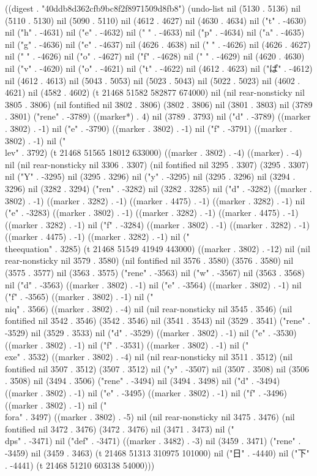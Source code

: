 
((digest . "40ddb8d362cfb9bc8f2f8971509d8fb8") (undo-list nil (5130 . 5136) nil (5110 . 5130) nil (5090 . 5110) nil (4612 . 4627) nil (4630 . 4634) nil ("t" . -4630) nil ("h" . -4631) nil ("e" . -4632) nil (" " . -4633) nil ("p" . -4634) nil ("a" . -4635) nil ("g" . -4636) nil ("e" . -4637) nil (4626 . 4638) nil (" " . -4626) nil (4626 . 4627) nil (" " . -4626) nil ("o" . -4627) nil ("f" . -4628) nil (" " . -4629) nil (4620 . 4630) nil ("v" . -4620) nil ("o" . -4621) nil ("t" . -4622) nil (4612 . 4623) nil ("ぱ" . -4612) nil (4612 . 4613) nil (5043 . 5053) nil (5023 . 5043) nil (5022 . 5023) nil (4602 . 4621) nil (4582 . 4602) (t 21468 51582 582877 674000) nil (nil rear-nonsticky nil 3805 . 3806) (nil fontified nil 3802 . 3806) (3802 . 3806) nil (3801 . 3803) nil (3789 . 3801) ("rene" . -3789) ((marker*) . 4) nil (3789 . 3793) nil ("d" . -3789) ((marker . 3802) . -1) nil ("e" . -3790) ((marker . 3802) . -1) nil ("f" . -3791) ((marker . 3802) . -1) nil ("\\lev" . 3792) (t 21468 51565 18012 633000) ((marker . 3802) . -4) ((marker) . -4) nil (nil rear-nonsticky nil 3306 . 3307) (nil fontified nil 3295 . 3307) (3295 . 3307) nil ("Y" . -3295) nil (3295 . 3296) nil ("y" . -3295) nil (3295 . 3296) nil (3294 . 3296) nil (3282 . 3294) ("ren" . -3282) nil (3282 . 3285) nil ("d" . -3282) ((marker . 3802) . -1) ((marker . 3282) . -1) ((marker . 4475) . -1) ((marker . 3282) . -1) nil ("e" . -3283) ((marker . 3802) . -1) ((marker . 3282) . -1) ((marker . 4475) . -1) ((marker . 3282) . -1) nil ("f" . -3284) ((marker . 3802) . -1) ((marker . 3282) . -1) ((marker . 4475) . -1) ((marker . 3282) . -1) nil ("\\theequation" . 3285) (t 21468 51549 41949 443000) ((marker . 3802) . -12) nil (nil rear-nonsticky nil 3579 . 3580) (nil fontified nil 3576 . 3580) (3576 . 3580) nil (3575 . 3577) nil (3563 . 3575) ("rene" . -3563) nil ("w" . -3567) nil (3563 . 3568) nil ("d" . -3563) ((marker . 3802) . -1) nil ("e" . -3564) ((marker . 3802) . -1) nil ("f" . -3565) ((marker . 3802) . -1) nil ("\\niq" . 3566) ((marker . 3802) . -4) nil (nil rear-nonsticky nil 3545 . 3546) (nil fontified nil 3542 . 3546) (3542 . 3546) nil (3541 . 3543) nil (3529 . 3541) ("rene" . -3529) nil (3529 . 3533) nil ("d" . -3529) ((marker . 3802) . -1) nil ("e" . -3530) ((marker . 3802) . -1) nil ("f" . -3531) ((marker . 3802) . -1) nil ("\\exe" . 3532) ((marker . 3802) . -4) nil (nil rear-nonsticky nil 3511 . 3512) (nil fontified nil 3507 . 3512) (3507 . 3512) nil ("y" . -3507) nil (3507 . 3508) nil (3506 . 3508) nil (3494 . 3506) ("rene" . -3494) nil (3494 . 3498) nil ("d" . -3494) ((marker . 3802) . -1) nil ("e" . -3495) ((marker . 3802) . -1) nil ("f" . -3496) ((marker . 3802) . -1) nil ("\\fora" . 3497) ((marker . 3802) . -5) nil (nil rear-nonsticky nil 3475 . 3476) (nil fontified nil 3472 . 3476) (3472 . 3476) nil (3471 . 3473) nil ("\\dps" . -3471) nil ("def" . -3471) ((marker . 3482) . -3) nil (3459 . 3471) ("rene" . -3459) nil (3459 . 3463) (t 21468 51313 310975 101000) nil ("日" . -4440) nil ("下" . -4441) (t 21468 51210 603138 54000)))
